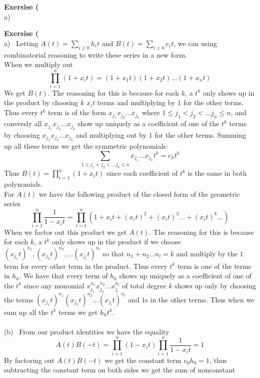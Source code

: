 \documentclass[12pt]{article}
\newenvironment{ques}[1]{\textbf{Exersise #1}\vspace{1 mm}\\ }{\bigskip}
\theoremstyle{definition}
\renewcommand{\l}{\left }
\renewcommand{\r}{\right }
\begin{document}
\begin{ques}{9.4}
	(a) \ 
\end{ques}

\begin{ques}{9.5}
	(a) \ Letting $A(t) = \sum_{i \geq 0} h_it$ and $B(t) =  \sum_{i \geq 0}
	e_it$, we can using combinatorial reasoning to write these series in a new
	form.\\
	When we multiply out 
	$$\prod_{i = 1}^n (1 + x_it) = (1 + x_1t)(1 + x_2t) \dots (1 + x_nt) $$
	We get $B(t)$. The reasoning for this is because for each $k$, a $t^k$ only
	shows up in the product by choosing $k$ $x_it$ terms and multiplying by $1$
	for the other terms. Thus every $t^k$ term is of the form $x_{j_1}x_{j_2}
	\dots x_{j_k}$ where $1\leq j_1 < j_2 < \dots j_n \leq n$, and conversly
	all $x_{j_1}x_{j_2} \dots x_{j_k}$ show up uniquely as a coefficient of one
	of the $t^k$ terms by choosing $x_{j_1}x_{j_2} \dots x_{j_k}$ and
	multiplying out by $1$ for the other terms. Summing up all these terms we
	get the symmetric polynomials:
	$$\sum_{1 \leq j_1 < j_2 < \dots j_k \leq n} x_{j_1} \dots x_{j_k}t^k = e_kt^k$$
	Thus $B(t) = \prod_{i = 1}^n (1 + x_it)$ since each coefficient of $t^k$ is
	the same in both polynomials.\\
	For $A(t)$ we have the following product of the closed form of the
	geometric series
	$$\prod_{i = 1}^n \frac1{ 1 - x_it } = \prod_{i = 1}^n\l(1 + x_it +
	(x_it)^2 + (x_it)^3 \dots + (x_it)^k \dots \r)$$
	When we factor out this product we get $A(t)$. The reasoning for this is
	because for each $k$, a $t^k$ only shows up in the product if we choose
	$(x_{j_1}t)^{n_1}, (x_{j_2}t)^{n_2}, \dots (x_{j_l}t)^{n_l}$ so that $n_1 +
	n_2 \dots n_l = k$ and multiply by the $1$ term for every other
	term in the product. Thus every $t^k$ term is one of the terms in $h_k$. We
	have that every term of $h_k$ shows up uniquely as a coefficient of one of
	the $t^k$ since any monomial $x_{j_1}^{n_1}x_{j_2}^{n_2}\dots
	x_{j_l}^{n_l}$ of total degree $k$ shows up only by choosing the terms
	$(x_{j_1}t)^{n_1}(x_{j_2}t)^{n_2}\dots (x_{j_l}t)^{n_l}$ and $1$s in the
	other terms. Thus when we sum up all the $t^k$ terms we get $h_kt^k$.\\
	\\
	(b) \ From our product identities we have the equality
	$$A(t)B(-t) = \prod_{i = 1}^n (1 - x_it)\prod_{i = 1}^n \frac1{ 1 - x_it } = 1$$
	By factoring out $A(t)B(-t)$ we get the constant term $e_0h_0 = 1$, thus
	subtracting the constant term on both sides we get the sum of nonconstant

\end{ques}
\end{document}
